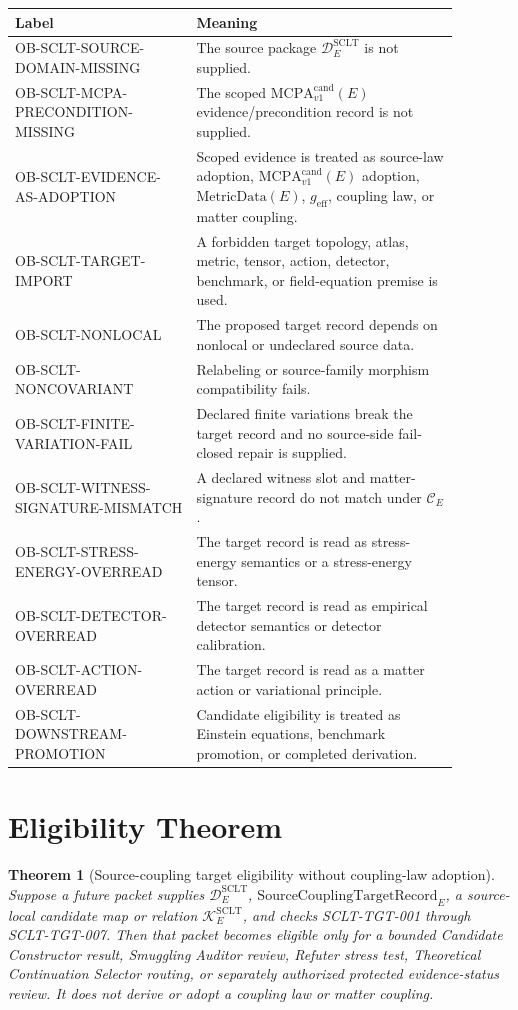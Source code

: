 \documentclass[11pt]{article}
\newcommand{\MetricData}{\mathrm{MetricData}}
\newcommand{\geff}{g_{\mathrm{eff}}}
\newcommand{\MCPA}{\mathrm{MCPA}^{\mathrm{cand}}_{v1}}
\newcommand{\SourceCoupRec}{\mathrm{SourceCouplingTargetRecord}}
\newtheorem{theorem}{Theorem}
\begin{document}
\begin{longtable}{p{0.36\linewidth}p{0.52\linewidth}}
\toprule
Label & Meaning \\
\midrule
OB-SCLT-SOURCE-DOMAIN-MISSING & The source package \(\mathcal{D}^{\mathrm{SCLT}}_E\) is not supplied. \\
OB-SCLT-MCPA-PRECONDITION-MISSING & The scoped \(\MCPA(E)\) evidence/precondition record is not supplied. \\
OB-SCLT-EVIDENCE-AS-ADOPTION & Scoped evidence is treated as source-law adoption, \(\MCPA(E)\) adoption, \(\MetricData(E)\), \(\geff\), coupling law, or matter coupling. \\
OB-SCLT-TARGET-IMPORT & A forbidden target topology, atlas, metric, tensor, action, detector, benchmark, or field-equation premise is used. \\
OB-SCLT-NONLOCAL & The proposed target record depends on nonlocal or undeclared source data. \\
OB-SCLT-NONCOVARIANT & Relabeling or source-family morphism compatibility fails. \\
OB-SCLT-FINITE-VARIATION-FAIL & Declared finite variations break the target record and no source-side fail-closed repair is supplied. \\
OB-SCLT-WITNESS-SIGNATURE-MISMATCH & A declared witness slot and matter-signature record do not match under \(\mathcal{C}_E\). \\
OB-SCLT-STRESS-ENERGY-OVERREAD & The target record is read as stress-energy semantics or a stress-energy tensor. \\
OB-SCLT-DETECTOR-OVERREAD & The target record is read as empirical detector semantics or detector calibration. \\
OB-SCLT-ACTION-OVERREAD & The target record is read as a matter action or variational principle. \\
OB-SCLT-DOWNSTREAM-PROMOTION & Candidate eligibility is treated as Einstein equations, benchmark promotion, or completed derivation. \\
\bottomrule
\end{longtable}

\section{Eligibility Theorem}

\begin{theorem}[Source-coupling target eligibility without coupling-law adoption]
Suppose a future packet supplies \(\mathcal{D}^{\mathrm{SCLT}}_E\),
\(\SourceCoupRec_E\), a source-local candidate map or relation
\(\mathcal{K}^{\mathrm{SCLT}}_E\), and checks SCLT-TGT-001 through
SCLT-TGT-007. Then that packet becomes eligible only for a bounded Candidate
Constructor result, Smuggling Auditor review, Refuter stress test,
Theoretical Continuation Selector routing, or separately authorized protected
evidence-status review. It does not derive or adopt a coupling law or matter
coupling.
\end{theorem}
\end{document}
